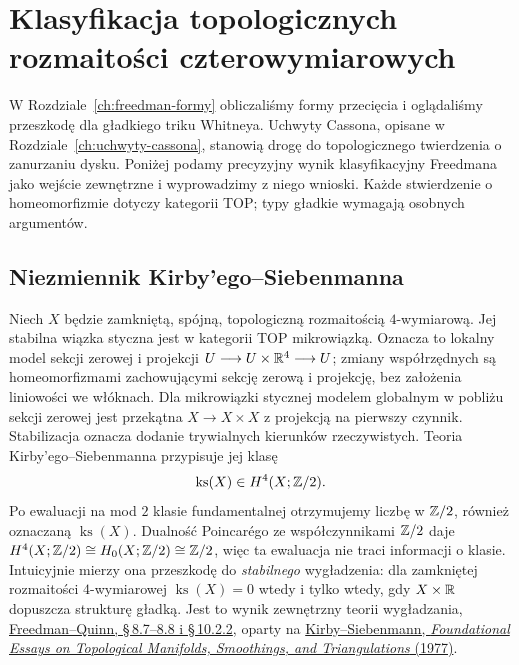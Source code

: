 \chapter{Klasyfikacja topologicznych rozmaitości czterowymiarowych}
\label{ch:freedman-klasyfikacja}

W Rozdziale~\ref{ch:freedman-formy} obliczaliśmy formy
przecięcia i oglądaliśmy przeszkodę dla gładkiego
triku Whitneya. Uchwyty Cassona, opisane w
Rozdziale~\ref{ch:uchwyty-cassona}, stanowią drogę
do topologicznego twierdzenia o zanurzaniu dysku.
Poniżej podamy precyzyjny wynik klasyfikacyjny
Freedmana jako wejście zewnętrzne i wyprowadzimy
z niego wnioski. Każde stwierdzenie o homeomorfizmie
dotyczy kategorii TOP; typy gładkie wymagają
osobnych argumentów.

\section{Niezmiennik Kirby'ego--Siebenmanna}
\label{sec:freedman-ks}

Niech $X$ będzie zamkniętą, spójną, topologiczną
rozmaitością $4$-wymiarową. Jej stabilna wiązka
styczna jest w kategorii TOP mikrowiązką. Oznacza to
lokalny model sekcji zerowej i projekcji
$U\longrightarrow U\times\mathbb{R}^4\longrightarrow U$;
zmiany współrzędnych są homeomorfizmami zachowującymi
sekcję zerową i projekcję, bez założenia liniowości we włóknach.
Dla mikrowiązki stycznej modelem globalnym w pobliżu
sekcji zerowej jest przekątna $X\to X\times X$
z projekcją na pierwszy czynnik. Stabilizacja oznacza
dodanie trywialnych kierunków rzeczywistych. Teoria
Kirby'ego--Siebenmanna przypisuje jej klasę
\begin{equation}\label{eq:freedman-ks}
 \operatorname{ks}(X)\in H^4(X;\mathbb{Z}/2).
\end{equation}
Po ewaluacji na mod $2$ klasie fundamentalnej
otrzymujemy liczbę w $\mathbb{Z}/2$, również oznaczaną
$\operatorname{ks}(X)$. Dualność Poincarégo ze
współczynnikami $\mathbb{Z}/2$ daje
$H^4(X;\mathbb{Z}/2)\cong H_0(X;\mathbb{Z}/2)\cong\mathbb{Z}/2$,
więc ta ewaluacja nie traci informacji o klasie.
Intuicyjnie mierzy ona
przeszkodę do \emph{stabilnego} wygładzenia: dla
zamkniętej rozmaitości $4$-wymiarowej
$\operatorname{ks}(X)=0$ wtedy i tylko wtedy,
gdy $X\times\mathbb{R}$ dopuszcza strukturę gładką.
Jest to wynik zewnętrzny teorii wygładzania,
\href{https://archive.mpim-bonn.mpg.de/4789/2/FreedmanQuinn-TopologyOf4Manifolds-Reformatted2013.pdf}
{Freedman--Quinn, \S\,8.7--8.8 i \S\,10.2.2},
oparty na
\href{https://www.maths.ed.ac.uk/~v1ranick/papers/ks.pdf}
{Kirby--Siebenmann, \emph{Foundational Essays on
Topological Manifolds, Smoothings, and Triangulations}
(1977)}.

